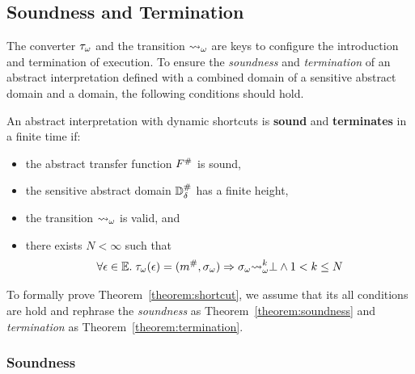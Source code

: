 \subsection{Soundness and Termination}
The converter ${\tau}_\omega$ and the {\sealed} transition ${\leadsto}_\omega$ are
keys to configure the introduction and termination of {\sealed}
execution.  To ensure the \textit{soundness} and \textit{termination} of an
abstract interpretation defined with a combined domain of a sensitive abstract
domain and a {\sealed} domain, the following conditions should hold.

\begin{theorem}\label{theorem:shortcut}
An abstract interpretation with dynamic shortcuts is \textbf{sound} and
\textbf{terminates} in a finite time if:
  \begin{itemize}
    \item the abstract transfer function ${F}^{\#}$ is sound,
    \item the sensitive abstract domain ${\mathbb{D}}^{\#}_\delta$ has a finite height,
    \item the {\sealed} transition ${\leadsto}_\omega$ is valid, and
    \item there exists $N < \infty$ such that
      \[
        \forall \epsilon \in \mathbb{E}. \; {\tau}_\omega(\epsilon) = ({m}^{\#},
        {\sigma}_\omega) \Rightarrow {\sigma}_\omega
        {\leadsto}_\omega^k \bot \wedge 1 < k \leq N
      \]
  \end{itemize}
\end{theorem}

To formally prove Theorem~\ref{theorem:shortcut}, we assume that its all
conditions are hold and rephrase the \textit{soundness} as
Theorem~\ref{theorem:soundness} and \textit{termination} as
Theorem~\ref{theorem:termination}.

\subsubsection{Soundness}

